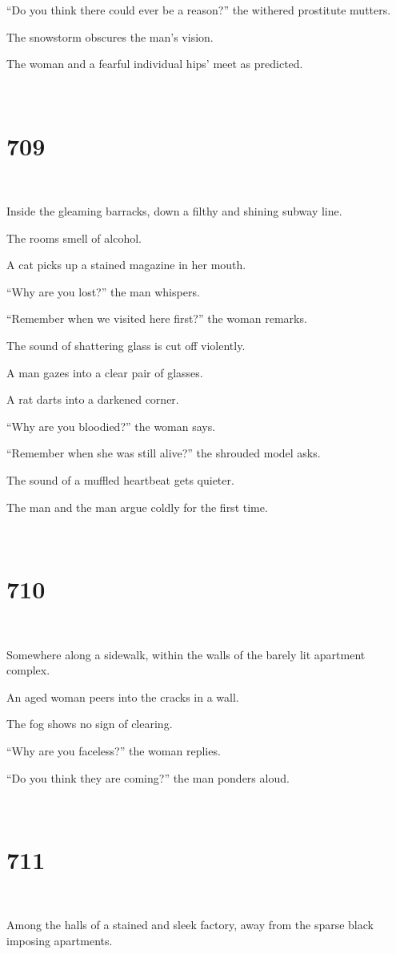 \documentclass{report}
\begin{document}
``Do you think there could ever be a reason?'' the withered prostitute mutters.

The snowstorm obscures the man's vision.

The woman and a fearful individual hips' meet as predicted.

~
\chapter*{709}
~

Inside the gleaming barracks, down a filthy and shining subway line.

The rooms smell of alcohol.

A cat picks up a stained magazine in her mouth.

``Why are you lost?'' the man whispers.

``Remember when we visited here first?'' the woman remarks.

The sound of shattering glass is cut off violently.

A man gazes into a clear pair of glasses.

A rat darts into a darkened corner.

``Why are you bloodied?'' the woman says.

``Remember when she was still alive?'' the shrouded model asks.

The sound of a muffled heartbeat gets quieter.

The man and the man argue coldly for the first time.

~
\chapter*{710}
~

Somewhere along a sidewalk, within the walls of the barely lit apartment complex.

An aged woman peers into the cracks in a wall.

The fog shows no sign of clearing.

``Why are you faceless?'' the woman replies.

``Do you think they are coming?'' the man ponders aloud.

~
\chapter*{711}
~

Among the halls of a stained and sleek factory, away from the sparse black imposing apartments.
\end{document}
